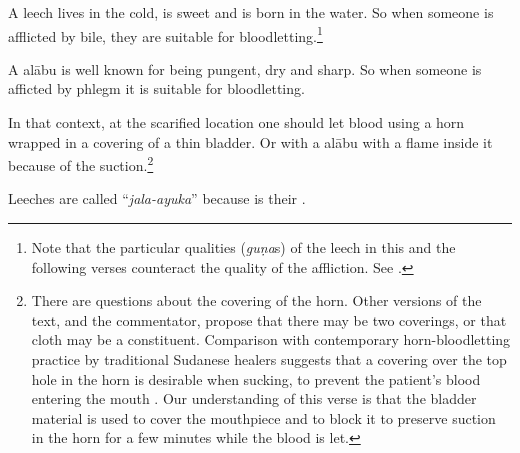 \begin{translation}
\item[1.13.6]

A leech lives in the cold, is sweet and is born in the water. So when
someone is afflicted by bile, they are suitable for
bloodletting.\footnote{Note that the particular qualities (\emph{guṇa}s) of
    the leech in this and the following verses counteract the quality of the
    affliction.  See \cite[113, table 1]{broo-2018}.}

\item[1.13.7]

A \gls{alābu} is well known for being pungent, dry and sharp.  So
when someone is afficted by phlegm it is suitable for bloodletting.

\item[1.13.8]

In that context, at the scarified location one should let blood using a
horn wrapped in a covering of a thin bladder.  Or with a \gls{alābu} with a
flame inside it because of the suction.\footnote{There are questions about
    the covering of the horn.  Other versions of the text, and the commentator,
    propose that there may be two coverings, or that cloth may be a constituent.
    Comparison with contemporary horn-bloodletting practice by traditional
    Sudanese healers suggests that a covering over the top hole in the horn is
    desirable when sucking, to prevent the patient's blood entering the mouth
    \citep{pbs-2020}.  Our understanding of this verse is that the bladder
    material is used to cover the mouthpiece and to block it to preserve suction in
    the horn for a few minutes while the blood is let. }

\item[1.13.9]

Leeches are called “\emph{jala-ayuka}” because  is their 
.





    
\end{translation}



